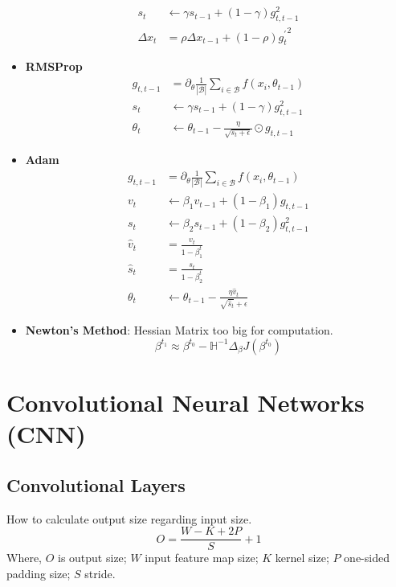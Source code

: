 \documentclass[a4paper]{article}
\begin{document}
\begin{itemize}
\begin{align}
		s_t &\leftarrow \gamma s_{t-1} + (1 - \gamma) g_{t, t-1}^2	 \\
		\Delta x_t &= \rho \Delta x_{t-1} + (1 - \rho) {g_t^{\prime}}^2
	\end{align}
	\item \textbf{RMSProp}
	\begin{align}
		g_{t, t-1} &= \partial_{\theta} \frac{1}{|\mathcal{B}|} \sum_{i \in \mathcal{B}} f(x_i, \theta_{t-1}) \\
		s_t &\leftarrow \gamma s_{t-1} + (1 - \gamma) g_{t, t-1}^2	 \\
		\theta_{t} &\leftarrow \theta_{t-1} - \frac{\eta}{\sqrt{s_t + \epsilon}} \odot g_{t, t-1}
	\end{align}
	\item \textbf{Adam}
	\begin{align}
		g_{t, t-1} &= \partial_{\theta} \frac{1}{|\mathcal{B}|} \sum_{i \in \mathcal{B}} f(x_i, \theta_{t-1}) \\
		v_t &\leftarrow \beta_1 v_{t-1} + (1 - \beta_1) g_{t, t-1}	 \\
		s_t &\leftarrow \beta_2 s_{t-1} + (1 - \beta_2) g_{t, t-1}^2	 \\
		\hat{v}_t &= \frac{v_t}{1 - {\beta}_1^{t}} \\
		\hat{s}_t &= \frac{s_t}{1 - {\beta}_2^{t}} \\
		\theta_{t} &\leftarrow \theta_{t-1} - \frac{\eta \hat{v}_t}{\sqrt{\hat{s}_t} + \epsilon}
	\end{align}
	\item \textbf{Newton's Method}: Hessian Matrix too big for computation.
	\begin{equation}
		\mathbb{\beta}^{t_1} \approx \mathbb{\beta}^{t_0} - \mathbb{H}^{-1} \Delta_{\beta} J (\mathbb{\beta}^{t_0})
	\end{equation}
\end{itemize}

\section{Convolutional Neural Networks (CNN)}

\subsection{Convolutional Layers}

How to calculate output size regarding input size.
\begin{equation}
	O = \frac{W - K + 2P}{S} + 1
\end{equation}
Where, $O$ is output size; $W$ input feature map size; $K$ kernel size; $P$ one-sided padding size; $S$ stride.
\end{document}
